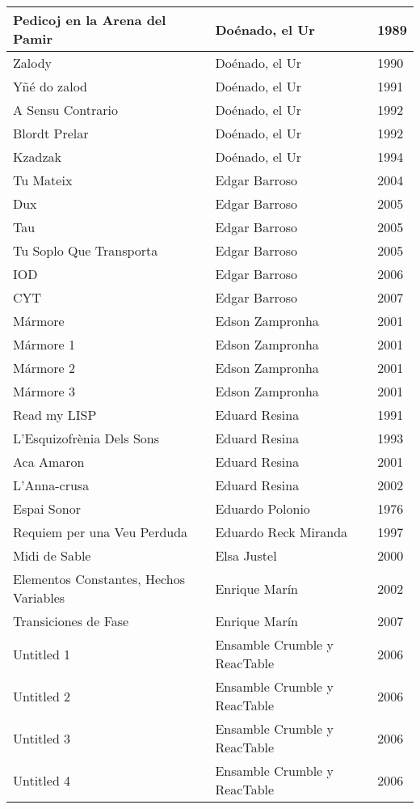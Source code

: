 \begin{center}
\begin{longtable}{ p{}  p{}  p{} }
Pedicoj en la Arena del Pamir & Doénado, el Ur & 1989 \\ \midrule 
Zalody & Doénado, el Ur & 1990 \\ \midrule 
Yñé do zalod & Doénado, el Ur & 1991 \\ \midrule 
A Sensu Contrario & Doénado, el Ur & 1992 \\ \midrule 
Blordt Prelar & Doénado, el Ur & 1992 \\ \midrule 
Kzadzak & Doénado, el Ur & 1994 \\ \midrule 
Tu Mateix & Edgar Barroso & 2004 \\ \midrule 
Dux & Edgar Barroso & 2005 \\ \midrule 
Tau & Edgar Barroso & 2005 \\ \midrule 
Tu Soplo Que Transporta & Edgar Barroso & 2005 \\ \midrule 
IOD & Edgar Barroso & 2006 \\ \midrule 
CYT & Edgar Barroso & 2007 \\ \midrule 
Mármore & Edson Zampronha & 2001 \\ \midrule 
Mármore 1 & Edson Zampronha & 2001 \\ \midrule 
Mármore 2 & Edson Zampronha & 2001 \\ \midrule 
Mármore 3 & Edson Zampronha & 2001 \\ \midrule 
Read my LISP & Eduard Resina & 1991 \\ \midrule 
L'Esquizofrènia Dels Sons & Eduard Resina & 1993 \\ \midrule 
Aca Amaron & Eduard Resina & 2001 \\ \midrule 
L'Anna-crusa & Eduard Resina & 2002 \\ \midrule 
Espai Sonor & Eduardo Polonio & 1976 \\ \midrule 
Requiem per una Veu Perduda & Eduardo Reck Miranda & 1997 \\ \midrule 
Midi de Sable & Elsa Justel & 2000 \\ \midrule 
Elementos Constantes, Hechos Variables & Enrique Marín & 2002 \\ \midrule 
Transiciones de Fase & Enrique Marín & 2007 \\ \midrule 
Untitled 1 & Ensamble Crumble y ReacTable & 2006 \\ \midrule 
Untitled 2 & Ensamble Crumble y ReacTable & 2006 \\ \midrule 
Untitled 3 & Ensamble Crumble y ReacTable & 2006 \\ \midrule 
Untitled 4 & Ensamble Crumble y ReacTable & 2006 \\ \midrule 

\end{longtable}
\end{center}
